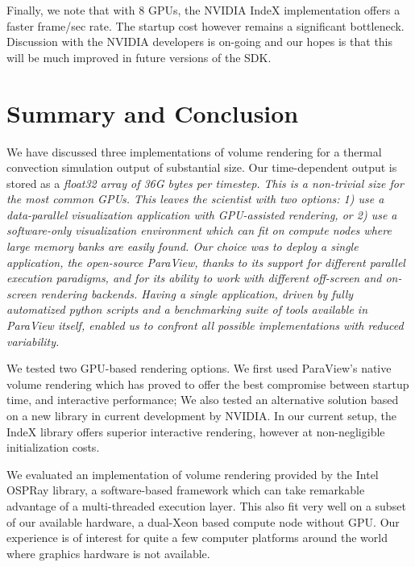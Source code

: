 \documentclass[5p,times]{elsarticle}
\begin{document}
Finally, we note that with 8 GPUs, the NVIDIA IndeX implementation offers a faster
frame/sec rate. The startup cost however remains a significant bottleneck. Discussion with
the NVIDIA developers is on-going and our hopes is that this will be much improved
in future versions of the SDK.

\section{Summary and Conclusion}

We have discussed three implementations of volume rendering for a thermal convection
simulation output of substantial size. Our time-dependent output is stored as a
\it{float32} \rm array of 36G bytes per timestep. This is a non-trivial size for the most common
GPUs. This leaves the scientist with two options: 1) use a data-parallel visualization
application with GPU-assisted rendering, or 2) use a \it{software-only} \rm
visualization environment which can fit on compute nodes where large memory
banks are easily found. Our choice was to deploy a single application, the open-source
ParaView, thanks to its support for different parallel execution paradigms, and for its ability to work with different off-screen and on-screen rendering backends. Having a single application,
driven by fully automatized python scripts and a benchmarking suite of tools
available in ParaView itself, enabled us to confront all possible implementations with reduced variability.

We tested two GPU-based rendering options. We first used ParaView's native volume rendering which has proved to offer the best compromise between startup time, and interactive performance; We also tested an alternative solution based on a new library in current development by NVIDIA. In our current setup, the IndeX library offers superior interactive rendering, however at non-negligible initialization costs.

We evaluated an implementation of volume rendering provided by the Intel OSPRay library,
a software-based framework which can take remarkable advantage of a multi-threaded
execution layer. This also fit very well on a subset of our available hardware, a dual-Xeon based compute node without GPU. Our experience is of interest for quite a few computer platforms around the world where graphics hardware is not available. 
\end{document}
